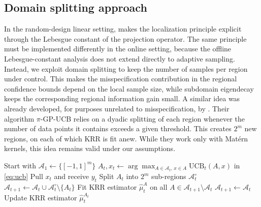 \documentclass{article}
\let\cite\citep
\numberwithin{theorem}{section}
\theoremstyle{definition}
\newcommand{\As}{\mathcal A}
\begin{document}
\subsection{Domain splitting approach}

In the random-design linear setting, \cite{maran2025beyond} makes the localization principle explicit through the Lebesgue constant of the projection operator. The same principle must be implemented differently in the online setting, because the offline Lebesgue-constant analysis does not extend directly to adaptive sampling. Instead, we exploit domain splitting to keep the number of samples per region under control. This makes the misspecification contribution in the regional confidence bounds depend on the local sample size, while subdomain eigendecay keeps the corresponding regional information gain small. A similar idea was already developed, for purposes unrelated to misspecification, by \cite{janz2020bandit}. Their algorithm $\pi$-\textsc{GP-UCB} relies on a dyadic splitting of each region whenever the number of data points it contains exceeds a given threshold. This creates $2^m$ new regions, on each of which KRR is fit anew. While they work only with Mat\'ern kernels, this idea remains valid under our assumptions.

\begin{algorithm}[t]
\footnotesize
\begin{algorithmic}[1]
    \State Start with $\As_1\gets \{[-1,1]^m\}$
        \State $A_t,x_t\gets \arg\max_{A\in \As_t,\,x\in A} \mathrm{UCB}_t(A,x)$ in \eqref{eq:ucb}
        \State Pull $x_t$ and receive $y_t$
        \label{algline:split}
            \State Split $A_t$ into $2^m$ sub-regions $\As_t^\circ$
            \State $\As_{t+1}\gets \As_{t}\cup \As_t^\circ \setminus \{A_t\}$
            \State Fit KRR estimator $\widehat \mu_t^A$ on all $A\in \As_{t+1}\setminus \As_{t}$
        \Else
            \State $\As_{t+1}\gets \As_{t}$
            \State Update KRR estimator $\widehat \mu_t^{A_t}$
        \EndIf
    \EndFor
\EndProcedure
\end{algorithmic}
\caption{$\pi$-\textsc{Misspec-GPUCB}}\label{alg:pigpucb}
\end{algorithm}
\end{document}
